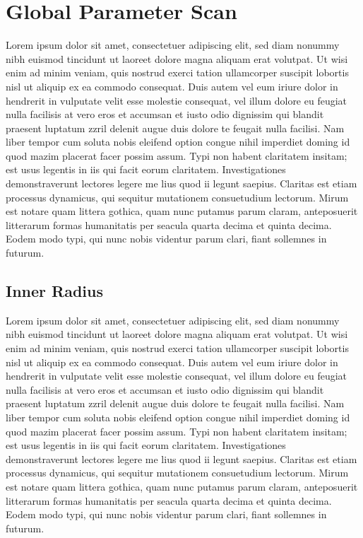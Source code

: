 \documentclass[final,3p,times,twocolumn]{elsarticle}
\begin{document}
\section{Global Parameter Scan}
Lorem ipsum dolor sit amet, consectetuer adipiscing elit, sed diam nonummy nibh euismod tincidunt ut laoreet dolore magna aliquam erat volutpat. Ut wisi enim ad minim veniam, quis
nostrud exerci tation ullamcorper suscipit lobortis nisl ut aliquip ex ea commodo consequat. Duis autem vel eum iriure dolor in hendrerit in vulputate velit esse molestie consequat,
vel illum dolore eu feugiat nulla facilisis at vero eros et accumsan et iusto odio dignissim qui blandit praesent luptatum zzril delenit augue duis dolore te feugait nulla facilisi.
Nam liber tempor cum soluta nobis eleifend option congue nihil imperdiet doming id quod mazim placerat facer possim assum. Typi non habent claritatem insitam; est usus legentis in
iis qui facit eorum claritatem. Investigationes demonstraverunt lectores legere me lius quod ii legunt saepius. Claritas est etiam processus dynamicus, qui sequitur mutationem
consuetudium lectorum. Mirum est notare quam littera gothica, quam nunc putamus parum claram, anteposuerit litterarum formas humanitatis per seacula quarta decima et quinta
decima. Eodem modo typi, qui nunc nobis videntur parum clari, fiant sollemnes in futurum.

\subsection{Inner Radius}
Lorem ipsum dolor sit amet, consectetuer adipiscing elit, sed diam nonummy nibh euismod tincidunt ut laoreet dolore magna aliquam erat volutpat. Ut wisi enim ad minim veniam, quis
nostrud exerci tation ullamcorper suscipit lobortis nisl ut aliquip ex ea commodo consequat. Duis autem vel eum iriure dolor in hendrerit in vulputate velit esse molestie consequat,
vel illum dolore eu feugiat nulla facilisis at vero eros et accumsan et iusto odio dignissim qui blandit praesent luptatum zzril delenit augue duis dolore te feugait nulla facilisi.
Nam liber tempor cum soluta nobis eleifend option congue nihil imperdiet doming id quod mazim placerat facer possim assum. Typi non habent claritatem insitam; est usus legentis in
iis qui facit eorum claritatem. Investigationes demonstraverunt lectores legere me lius quod ii legunt saepius. Claritas est etiam processus dynamicus, qui sequitur mutationem
consuetudium lectorum. Mirum est notare quam littera gothica, quam nunc putamus parum claram, anteposuerit litterarum formas humanitatis per seacula quarta decima et quinta
decima. Eodem modo typi, qui nunc nobis videntur parum clari, fiant sollemnes in futurum.
\end{document}
